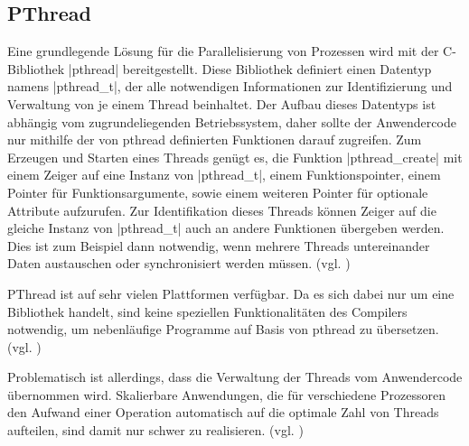 \documentclass[../main.tex]{subfiles}
\begin{document}
\subsection{PThread}
Eine grundlegende Lösung für die Parallelisierung von Prozessen wird mit der C-Bibliothek |pthread| bereitgestellt. Diese Bibliothek definiert einen Datentyp namens |pthread_t|, der alle notwendigen Informationen zur Identifizierung und Verwaltung von je einem Thread beinhaltet. Der Aufbau dieses Datentyps ist abhängig vom zugrundeliegenden Betriebssystem, daher sollte der Anwendercode nur mithilfe der von pthread definierten Funktionen darauf zugreifen. Zum Erzeugen und Starten eines Threads genügt es, die Funktion |pthread_create| mit einem Zeiger auf eine Instanz von |pthread_t|, einem Funktionspointer, einem Pointer für Funktionsargumente, sowie einem weiteren Pointer für optionale Attribute aufzurufen. Zur Identifikation dieses Threads können Zeiger auf die gleiche Instanz von |pthread_t| auch an andere Funktionen übergeben werden. Dies ist zum Beispiel dann notwendig, wenn mehrere Threads untereinander Daten austauschen oder synchronisiert werden müssen. (vgl. \cite{pthreadDoku})

PThread ist auf sehr vielen Plattformen verfügbar. Da es sich dabei nur um eine Bibliothek handelt, sind keine speziellen Funktionalitäten des Compilers notwendig, um nebenläufige Programme auf Basis von pthread zu übersetzen. (vgl. \cite{pthreadDoku})

Problematisch ist allerdings, dass die Verwaltung der Threads vom Anwendercode übernommen wird. Skalierbare Anwendungen, die für verschiedene Prozessoren den Aufwand einer Operation automatisch auf die optimale Zahl von Threads aufteilen, sind damit nur schwer zu realisieren. (vgl. \cite{pthreadDoku})
\end{document}

